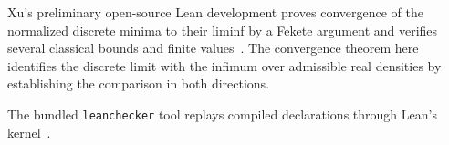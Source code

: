 Xu's preliminary open-source Lean development proves convergence
of the normalized discrete minima to their liminf by a Fekete
argument and verifies several classical bounds
and finite values~\cite{Xu2026MinimumOverlap}. The convergence
theorem here identifies the discrete limit with the infimum over
admissible real densities by establishing the comparison in both
directions.

The bundled \texttt{leanchecker} tool replays compiled declarations
through Lean's kernel~\cite{MorrisonUllrichLeanchecker436}.
